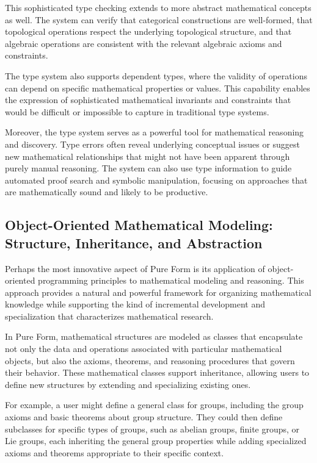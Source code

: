 This sophisticated type checking extends to more abstract mathematical concepts as well.
The system can verify that categorical constructions are well-formed, that topological operations respect the underlying topological structure, and that algebraic operations are consistent with the relevant algebraic axioms and constraints.

The type system also supports dependent types, where the validity of operations can depend on specific mathematical properties or values.
This capability enables the expression of sophisticated mathematical invariants and constraints that would be difficult or impossible to capture in traditional type systems.

Moreover, the type system serves as a powerful tool for mathematical reasoning and discovery.
Type errors often reveal underlying conceptual issues or suggest new mathematical relationships that might not have been apparent through purely manual reasoning.
The system can also use type information to guide automated proof search and symbolic manipulation, focusing on approaches that are mathematically sound and likely to be productive.

\subsection{Object-Oriented Mathematical Modeling: Structure, Inheritance, and Abstraction}

Perhaps the most innovative aspect of Pure Form is its application of object-oriented programming principles to mathematical modeling and reasoning.
This approach provides a natural and powerful framework for organizing mathematical knowledge while supporting the kind of incremental development and specialization that characterizes mathematical research.

In Pure Form, mathematical structures are modeled as classes that encapsulate not only the data and operations associated with particular mathematical objects, but also the axioms, theorems, and reasoning procedures that govern their behavior.
These mathematical classes support inheritance, allowing users to define new structures by extending and specializing existing ones.

For example, a user might define a general class for groups, including the group axioms and basic theorems about group structure.
They could then define subclasses for specific types of groups, such as abelian groups, finite groups, or Lie groups, each inheriting the general group properties while adding specialized axioms and theorems appropriate to their specific context.

